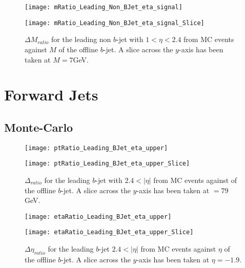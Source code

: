 	\begin{figure}[h]
		\centering

		\begin{minipage}[h]{0.33\linewidth}
			\texttt{[image: mRatio\_Leading\_Non\_BJet\_eta\_signal]}
		\end{minipage}
		\quad
		\begin{minipage}[h]{0.33\linewidth}
			\texttt{[image: mRatio\_Leading\_Non\_BJet\_eta\_signal\_Slice]}
		\end{minipage}
		\caption{$\Delta M_{ratio}$ for the leading \pt non $b$-jet with $1 < \eta < 2.4$ from MC events against $M$ of the offline $b$-jet. A slice across the $y$-axis has been taken at $M=7$GeV. }
		\label{fig:MC:leadingnonbmcore}
	\end{figure}

\newpage
\section{Forward  Jets}

		\subsection{Monte-Carlo}

		\begin{figure}[h]
			\centering
			\begin{minipage}[h]{0.33\linewidth}
				\texttt{[image: ptRatio\_Leading\_BJet\_eta\_upper]}

			\end{minipage}
			\quad
			\begin{minipage}[h]{0.33\linewidth}
				\texttt{[image: ptRatio\_Leading\_BJet\_eta\_upper\_Slice]}
			\end{minipage}
			\caption{$\Delta $\pt$_{ratio}$ for the leading \pt $b$-jet with $2.4 < |\eta|$ from MC events against \pt of the offline $b$-jet. A slice across the $y$-axis has been taken at \pt$=79$GeV. }
			\label{fig:MC:leadingbptforward}
		\end{figure}

		\begin{figure}[h]
			\centering

			\begin{minipage}[h]{0.33\linewidth}
				\texttt{[image: etaRatio\_Leading\_BJet\_eta\_upper]}
			\end{minipage}
			\quad
			\begin{minipage}[h]{0.33\linewidth}
				\texttt{[image: etaRatio\_Leading\_BJet\_eta\_upper\_Slice]}
			\end{minipage}
			\caption{$\Delta \eta_{ratio}$ for the leading \pt $b$-jet $2.4 < |\eta|$ from MC events against $\eta$ of the offline $b$-jet. A slice across the $y$-axis has been taken at $\eta=-1.9$. }
			\label{fig:MC:leadingbetaforward}
		\end{figure}

